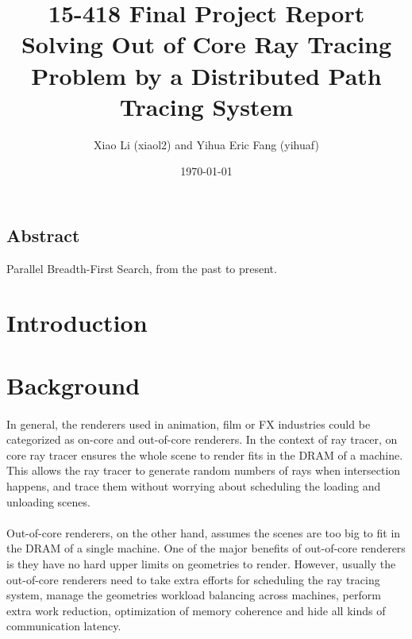 \documentclass[a4paper, oneside, 10pt]{article}
\title{{\bf 15-418 Final Project Report \\
 \large Solving Out of Core Ray Tracing Problem by a Distributed Path Tracing System}} %
\author{Xiao Li (xiaol2) and Yihua Eric Fang (yihuaf)}
\date{\today} %
\begin{document}
\maketitle
\thispagestyle{empty}
\newpage
\begin{center}
\vspace*{\fill}
\section*{Abstract}
Parallel Breadth-First Search, from the past to present.\\
\vspace*{\fill}
\newpage
\end{center}

\tableofcontents
\newpage

\section{Introduction}
\section{Background}
\paragraph{} In general, the renderers used in animation, film or FX industries could be categorized as on-core and out-of-core renderers.  In the context of ray tracer, on core ray tracer ensures the whole scene to render fits in the DRAM of a machine. This allows the ray tracer to generate random numbers of rays when intersection happens, and trace them without worrying about scheduling the loading and unloading scenes. 

\paragraph{} Out-of-core renderers, on the other hand, assumes the scenes are too big to fit in the DRAM of a single machine. One of the major benefits of out-of-core renderers is they have no hard upper limits on geometries to render. However, usually the out-of-core renderers need to take extra efforts for scheduling the ray tracing system, manage the geometries workload balancing across machines, perform extra work reduction, optimization of memory coherence and hide all kinds of communication latency. 
\end{document}
